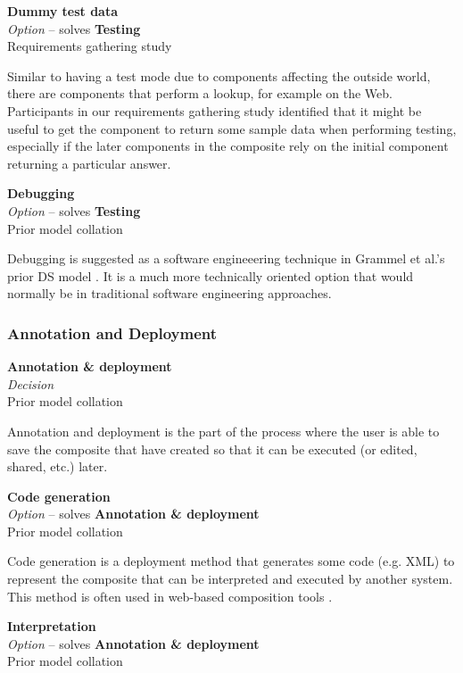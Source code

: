 \textbf{Dummy test data} \\ \emph{Option} -- solves \textbf{Testing} \\ Requirements gathering study

Similar to having a test mode due to components affecting the outside world, there are components that perform a lookup, for example on the Web. Participants in our requirements gathering study identified that it might be useful to get the component to return some sample data when performing testing, especially if the later components in the composite rely on the initial component returning a particular answer.

\textbf{Debugging} \\ \emph{Option} -- solves \textbf{Testing} \\ Prior model collation \cite{Grammel2010}

Debugging is suggested as a software engineeering technique in Grammel et al.'s prior DS model \cite{Grammel2010}. It is a much more technically oriented option that would normally be in traditional software engineering approaches.

\subsubsection{Annotation and Deployment}

\textbf{Annotation \& deployment} \\ \emph{Decision} \\ Prior model collation \cite{Mehandjiev2012}

Annotation and deployment is the part of the process where the user is able to save the composite that have created so that it can be executed (or edited, shared, etc.) later.

\textbf{Code generation} \\ \emph{Option} -- solves \textbf{Annotation \& deployment} \\ Prior model collation \cite{Pietschmann2010}

Code generation is a deployment method that generates some code (e.g. XML) to represent the composite that can be interpreted and executed by another system. This method is often used in web-based composition tools \cite{Pietschmann2010}.

\textbf{Interpretation} \\ \emph{Option} -- solves \textbf{Annotation \& deployment} \\ Prior model collation \cite{Mehandjiev2012}


